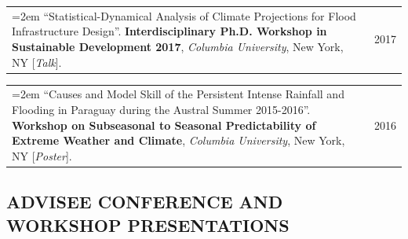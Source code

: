 \documentclass[10pt,oneside]{article}
\makeatletter
\newenvironment{alignedentrieshang}[1][2em]{%
  \noindent%
}{%
}
\newcommand{\hangingitem}[2]{%
  \noindent%
  \begin{tabular*}{\textwidth}{@{}p{0.85\textwidth}@{\extracolsep{\fill}}r@{}}%
    \hangindent=2em \hangafter=1 #1 & #2%
  \end{tabular*}%
}
\makeatother
\begin{document}
\begin{alignedentrieshang}
\hangingitem{\enquote{Statistical-Dynamical Analysis of Climate Projections for Flood Infrastructure Design}. \textbf{Interdisciplinary Ph.D. Workshop in Sustainable Development 2017}, \textit{Columbia University}, New York, NY [\textit{Talk}].}{2017}



\hangingitem{\enquote{Causes and Model Skill of the Persistent Intense Rainfall and Flooding in Paraguay during the Austral Summer 2015-2016}. \textbf{Workshop on Subseasonal to Seasonal Predictability of Extreme Weather and Climate}, \textit{Columbia University}, New York, NY [\textit{Poster}].}{2016}


\end{alignedentrieshang}

\subsection{ADVISEE CONFERENCE AND WORKSHOP PRESENTATIONS}
\end{document}
